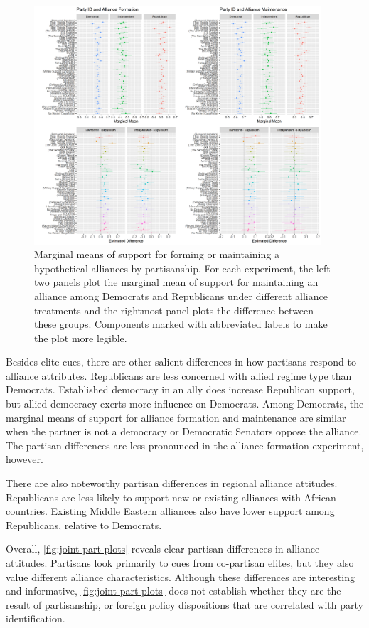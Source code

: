 \documentclass[12pt]{article}
\begin{document}
\begin{figure}
	\centering
		\includegraphics[width=0.95\textwidth]{joint-part-plots.png}
	\caption{Marginal means of support for forming or maintaining a hypothetical alliances by partisanship. For each experiment, the left two panels plot the marginal mean of support for maintaining an alliance among Democrats and Republicans under different alliance treatments and the rightmost panel plots the difference between these groups. Components marked with abbreviated labels to make the plot more legible.}
	\label{fig:joint-part-plots}
\end{figure}


Besides elite cues, there are other salient differences in how partisans respond to alliance attributes.
Republicans are less concerned with allied regime type than Democrats.  
Established democracy in an ally does increase Republican support, but allied democracy exerts more influence on Democrats. 
Among Democrats, the marginal means of support for alliance formation and maintenance are similar when the partner is not a democracy or Democratic Senators oppose the alliance.  
The partisan differences are less pronounced in the alliance formation experiment, however. 


There are also noteworthy partisan differences in regional alliance attitudes.
Republicans are less likely to support new or existing alliances with African countries. 
Existing Middle Eastern alliances also have lower support among Republicans, relative to Democrats.


Overall, \autoref{fig:joint-part-plots} reveals clear partisan differences in alliance attitudes. 
Partisans look primarily to cues from co-partisan elites, but they also value different alliance characteristics. 
Although these differences are interesting and informative, \autoref{fig:joint-part-plots} does not establish whether they are the result of partisanship, or foreign policy dispositions that are correlated with party identification. 
\end{document}
